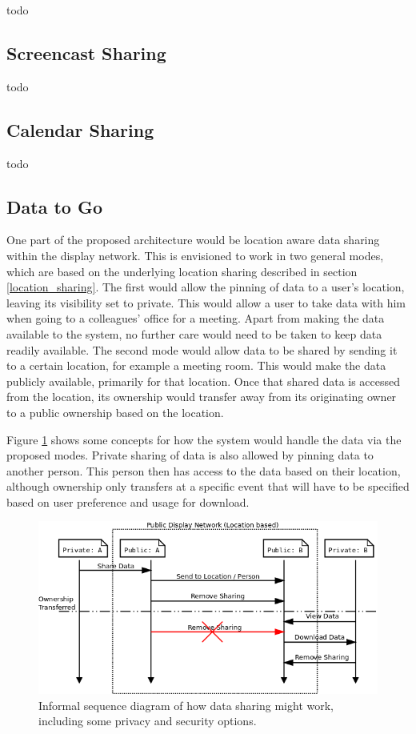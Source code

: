 todo

\subsection{Screencast Sharing}

todo

\subsection{Calendar Sharing}

todo

\subsection{Data to Go}
\label{data2go}

One part of the proposed architecture would be location aware data sharing within the display network.
This is envisioned to work in two general modes, which are based on the underlying location sharing described in section \ref{location_sharing}.
The first would allow the pinning of data to a user's location, leaving its visibility set to private.
This would allow a user to take data with him when going to a colleagues' office for a meeting.
Apart from making the data available to the system, no further care would need to be taken to keep data readily available.
The second mode would allow data to be shared by sending it to a certain location, for example a meeting room.
This would make the data publicly available, primarily for that location.
Once that shared data is accessed from the location, its ownership would transfer away from its originating owner to a public ownership based on the location.

Figure \ref{data_share_sequence} shows some concepts for how the system would handle the data via the proposed modes.
Private sharing of data is also allowed by pinning data to another person.
This person then has access to the data based on their location, although ownership only transfers at a specific event that will have to be specified based on user preference and usage for download.

\begin{figure}
	\centering
	\includegraphics[width=\linewidth]{img/data_sharing.png}
	\caption[Data Sharing Sequence]{Informal sequence diagram of how data sharing might work, including some privacy and security options.}
	\label{data_share_sequence}
\end{figure}

